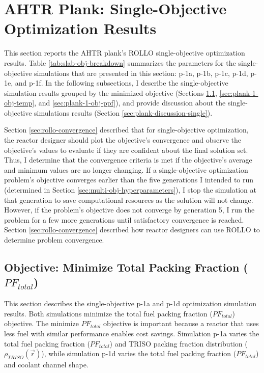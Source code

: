 \section{AHTR Plank: Single-Objective Optimization Results}
\label{sec:plank-one-obj}
This section reports the \gls{AHTR} plank's \gls{ROLLO} single-objective 
optimization results. 
Table \ref{tab:slab-obj-breakdown} summarizes the parameters for the single-objective 
simulations that are presented in this section: p-1a, p-1b, p-1c, p-1d, p-1e, and p-1f. 
In the following subsections, I describe the single-objective simulation results 
grouped by the minimized objective (Sections \ref{sec:plank-1-obj-pf}, 
\ref{sec:plank-1-obj-temp}, and \ref{sec:plank-1-obj-ppf}), and provide discussion 
about the single-objective simulations results (Section 
\ref{sec:plank-discussion-single}).

Section \ref{sec:rollo-convergence} described that for single-objective optimization, 
the reactor designer should plot the objective's convergence and observe the 
objective's values to evaluate if they are confident about the final solution set. 
Thus, I determine that the convergence criteria is met if the objective's 
average and minimum values are no longer changing. 
If a single-objective optimization problem's objective converges earlier than the 
five generations I intended to run (determined in Section 
\ref{sec:multi-obj-hyperparameters}), I stop the simulation at that generation to 
save computational resources as the solution will not change.
However, if the problem's objective does not converge by generation 5, I run the 
problem for a few more generations until satisfactory convergence is reached.
Section \ref{sec:rollo-convergence} described how reactor designers can use 
\gls{ROLLO} to determine problem convergence. 

\subsection{Objective: Minimize Total Packing Fraction ($PF_{total}$)}
\label{sec:plank-1-obj-pf}
This section describes the single-objective p-1a and p-1d optimization simulation
results. 
Both simulations minimize the total fuel packing fraction ($PF_{total}$) objective. 
The minimize $PF_{total}$ objective is important because a reactor that uses less fuel
with similar performance enables cost savings. 
Simulation p-1a varies the total fuel packing fraction ($PF_{total}$) and \gls{TRISO} 
packing fraction distribution ($\rho_{TRISO}(\vec{r})$), while simulation p-1d varies 
the total fuel packing fraction ($PF_{total}$) and coolant channel shape. 

